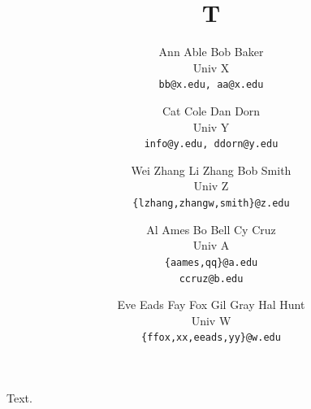\documentclass{article}
\title{T}
\author{Ann Able \quad Bob Baker \\ Univ X \\ \texttt{bb@x.edu, aa@x.edu}
\and Cat Cole \quad Dan Dorn \\ Univ Y \\ \texttt{info@y.edu, ddorn@y.edu}
\and Wei Zhang \quad Li Zhang \quad Bob Smith \\ Univ Z \\ \texttt{\{lzhang,zhangw,smith\}@z.edu}
\and Al Ames \quad Bo Bell \quad Cy Cruz \\ Univ A \\ \texttt{\{aames,qq\}@a.edu} \\ \texttt{ccruz@b.edu}
\and Eve Eads \quad Fay Fox \quad Gil Gray \quad Hal Hunt \\ Univ W \\ \texttt{\{ffox,xx,eeads,yy\}@w.edu}}
\begin{document}
\maketitle
Text.
\end{document}
